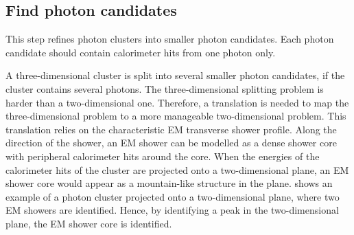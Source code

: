 \subsection{Find photon candidates}
\label{sec:photonCandiate}

This step refines photon clusters into smaller photon candidates. Each photon candidate should contain calorimeter hits from one photon only.

A three-dimensional cluster is split into several smaller photon candidates, if the cluster contains several photons. The three-dimensional splitting problem is harder than a two-dimensional one. Therefore, a translation is needed to map the three-dimensional problem to a more manageable two-dimensional problem. This translation relies on the characteristic EM transverse shower profile. Along the direction of the shower, an EM shower can be modelled as a dense shower core with peripheral calorimeter hits around the core. When the energies of the calorimeter hits of the cluster are projected onto a two-dimensional plane, an EM shower core would appear as a mountain-like structure in the plane.  shows an example of a photon cluster projected onto a two-dimensional plane, where two EM showers are identified. Hence, by identifying a peak in the two-dimensional plane, the EM shower core is identified.





